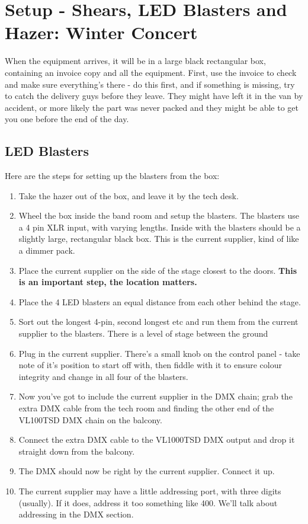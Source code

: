 \documentclass[11pt,a4paper]{book}
\begin{document}
\section{Setup - Shears, LED Blasters and Hazer: Winter Concert}
\label{sec:Setup - Shears, LED Blasters and Hazer: Winter Concert}
When the equipment arrives, it will be in a large black rectangular box, containing an invoice copy and all the equipment. First, use the invoice to check and make sure everything's there - do this first, and if something is missing, try to catch the delivery guys before they leave. They might have left it in the van by accident, or more likely the part was never packed and they might be able to get you one before the end of the day.
\subsection{LED Blasters}
Here are the steps for setting up the blasters from the box:
\begin{enumerate}
\item Take the hazer out of the box, and leave it by the tech desk.
\item Wheel the box inside the band room and setup the blasters. The blasters use a 4 pin XLR input, with varying lengths. Inside with the blasters should be a slightly large, rectangular black box. This is the current supplier, kind of like a dimmer pack.
\item Place the current supplier on the side of the stage closest to the doors. \textbf{This is an important step, the location matters.}
\item Place the 4 LED blasters an equal distance from each other behind the stage. 
\item Sort out the longest 4-pin, second longest etc and run them from the current supplier to the blasters. There is a level of stage between the ground
\item Plug in the current supplier. There's a small knob on the control panel - take note of it's position to start off with, then fiddle with it to ensure colour integrity and change in all four of the blasters. 
\item Now you've got to include the current supplier in the DMX chain; grab the extra DMX cable from the tech room and finding the other end of the VL100TSD DMX chain on the balcony.
\item Connect the extra DMX cable to the VL1000TSD DMX output and drop it straight down from the balcony.
\item The DMX should now be right by the current supplier. Connect it up.
\item The current supplier may have a little addressing port, with three digits (usually). If it does, address it too something like 400. We'll talk about addressing in the DMX section.
\end{enumerate}
\end{document}
